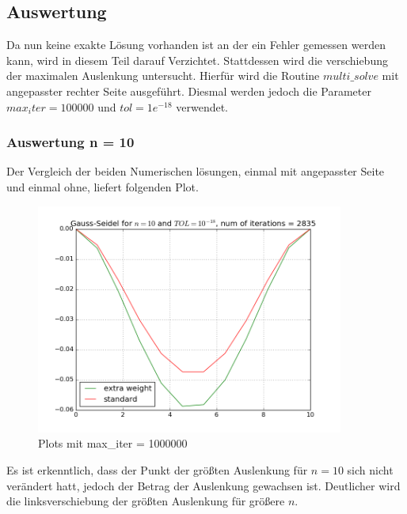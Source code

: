 \documentclass[12pt,titlepage]{article}
\begin{document}
	\subsection{Auswertung}
		Da nun keine exakte Lösung vorhanden ist an der ein Fehler gemessen werden kann, wird in diesem Teil darauf Verzichtet.
		Stattdessen wird die verschiebung der maximalen Auslenkung untersucht. Hierfür wird die Routine $multi\_solve$ mit angepasster rechter Seite
		ausgeführt. Diesmal werden jedoch die Parameter $max_iter=100000$ und $tol=1e^{-18}$ verwendet.
		
		\subsubsection{Auswertung n = 10}
			Der Vergleich der beiden Numerischen lösungen, einmal mit angepasster Seite und einmal ohne, liefert folgenden Plot.
			
		\begin{figure}[H] 
	 		\centering
	 		\includegraphics[width=0.9\textwidth]{bend.png}
	 		\caption{Plots mit max\_iter = 1000000}
	 		\label{fig:Bild5}
	 	\end{figure}
	 	
	 	Es ist erkenntlich, dass der Punkt der größten Auslenkung für $n = 10$ sich nicht verändert hatt, jedoch der Betrag der Auslenkung gewachsen ist.
	 	Deutlicher wird die linksverschiebung der größten Auslenkung für größere $n$.
	 	\newpage
\end{document}
